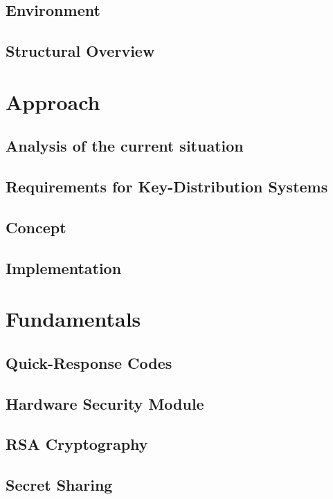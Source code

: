 \documentclass[12pt,twoside,a4paper,parskip]{scrbook}
\begin{document}
\section{Environment}

\section{Structural Overview}

\chapter{Approach}

\section{Analysis of the current situation}

\section{Requirements for Key-Distribution Systems}

\section{Concept}

\section{Implementation}

\chapter{Fundamentals}

\section{Quick-Response Codes}

\section{Hardware Security Module}

\section{RSA Cryptography}

\section{Secret Sharing}
\end{document}
